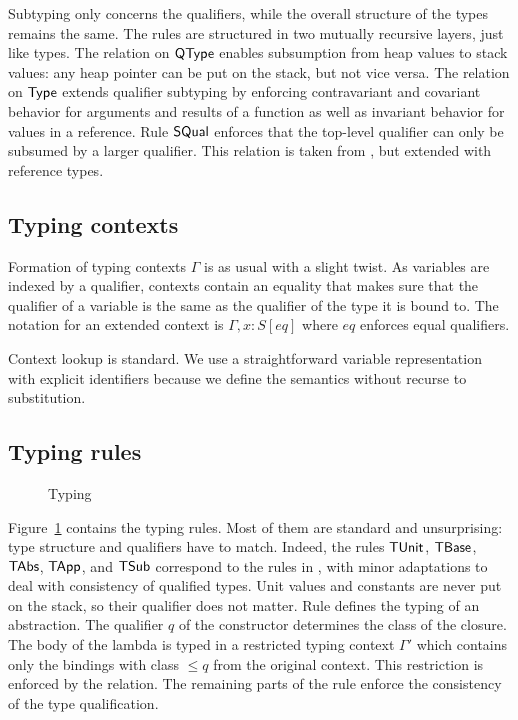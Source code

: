 \documentclass[sigplan,dvipsnames,screen]{acmart}
\begin{document}
Subtyping
only concerns the qualifiers, while the overall structure of the types
remains the same. The rules are
structured in two mutually recursive layers, just like types. The
relation on $\AQType$ enables subsumption from heap values to stack
values: any heap pointer can be put on the stack, but not vice
versa. The relation on $\AType$ extends qualifier 
subtyping by enforcing contravariant and covariant
behavior for arguments and results of a function as well as invariant
behavior for values in a reference. Rule $\ACon{SQual}$ enforces that
the top-level qualifier can only be subsumed by a larger qualifier. This relation is taken from
\citet{DBLP:conf/ecoop/XhebrajB0R22}, but extended with reference types.

\subsection{Typing contexts}
\label{sec:typing-contexts}

Formation of typing contexts $\Gamma$ is as usual with a slight
twist. As variables are indexed by a qualifier, contexts contain an
equality that makes sure that the qualifier of a variable is the same
as the qualifier of the type it is bound to. The notation for an
extended context is $\Gamma, x:S[eq]$ where $eq$ enforces equal qualifiers.
\Contexts

Context lookup is standard. We use a straightforward variable
representation with explicit identifiers because we define the
semantics without recurse to substitution.
\ContextLookup

\subsection{Typing rules}
\label{sec:typing-rules}
\begin{figure}[tp]
  \TypingRules  
  \caption{Typing}
  \label{fig:typing}
\end{figure}
Figure~\ref{fig:typing} contains the typing rules. Most of them are
standard and unsurprising: type structure and qualifiers have to
match. Indeed, the rules $\ACTUnit$, $\ACTBase$, $\ACTAbs$, $\ACTApp$,
and $\ACTSub$ correspond to the rules in
\citet{DBLP:conf/ecoop/XhebrajB0R22}, with minor adaptations to deal
with consistency of qualified types.
Unit values and constants are never put on the stack, so their
qualifier does not matter. Rule {\ACTAbs} defines the typing of an
abstraction. The qualifier $q$ of the {\AClam} constructor determines
the class of the closure. The body of the lambda is typed in a
restricted typing context $\Gamma'$ which contains only the
bindings with class $\le q$ from the original context. This
restriction is enforced by the {\AqBounded} relation. The remaining
parts of the rule enforce the consistency of the type
qualification.
\end{document}
